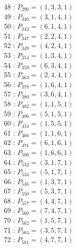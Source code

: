 \documentclass{article}
\begin{document}
{\begin{multicols}{3}
48 : $P_{290}=( 1, 3, 3, 1 )$\\
49 : $P_{340}=( 3, 1, 4, 1 )$\\
50 : $P_{343}=( 6, 1, 4, 1 )$\\
51 : $P_{347}=( 2, 2, 4, 1 )$\\
52 : $P_{349}=( 4, 2, 4, 1 )$\\
53 : $P_{354}=( 1, 3, 4, 1 )$\\
54 : $P_{359}=( 6, 3, 4, 1 )$\\
55 : $P_{363}=( 2, 4, 4, 1 )$\\
56 : $P_{378}=( 1, 6, 4, 1 )$\\
57 : $P_{380}=( 3, 6, 4, 1 )$\\
58 : $P_{402}=( 1, 1, 5, 1 )$\\
59 : $P_{406}=( 5, 1, 5, 1 )$\\
60 : $P_{434}=( 1, 5, 5, 1 )$\\
61 : $P_{466}=( 1, 1, 6, 1 )$\\
62 : $P_{471}=( 6, 1, 6, 1 )$\\
63 : $P_{506}=( 1, 6, 6, 1 )$\\
64 : $P_{532}=( 3, 1, 7, 1 )$\\
65 : $P_{534}=( 5, 1, 7, 1 )$\\
66 : $P_{546}=( 1, 3, 7, 1 )$\\
67 : $P_{550}=( 5, 3, 7, 1 )$\\
68 : $P_{557}=( 4, 4, 7, 1 )$\\
69 : $P_{560}=( 7, 4, 7, 1 )$\\
70 : $P_{562}=( 1, 5, 7, 1 )$\\
71 : $P_{564}=( 3, 5, 7, 1 )$\\
72 : $P_{581}=( 4, 7, 7, 1 )$\\
\end{multicols}


%


%


}%
\end{document}
